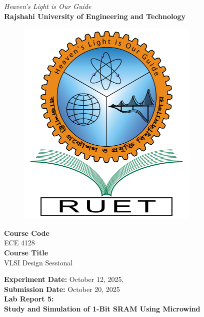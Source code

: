 \vspace*{\fill}
\begin{center}

    \emph{Heaven's Light is Our Guide} \\
    \textbf{Rajshahi University of Engineering and Technology} \\

    \begin{figure}[H]
        \centering
        \includegraphics[scale=.34]{images/RUET_logo.png}
        \label{fig:ruet_logo}
    \end{figure}
    \vspace{5mm}

    \textbf{Course Code}\\
    ECE 4128\\
    \vspace{3mm}
    \textbf{Course Title}\\
    VLSI Design Sessional

    \vspace{5mm}
    \textbf{Experiment Date:} {October 12, 2025},\\
    \textbf{Submission Date:} {October 20, 2025}\\

    \vspace{5mm}
    \textbf{Lab Report 5: \\
        Study and Simulation of 1-Bit SRAM Using Microwind}

    \vspace{15mm}


\end{center}
